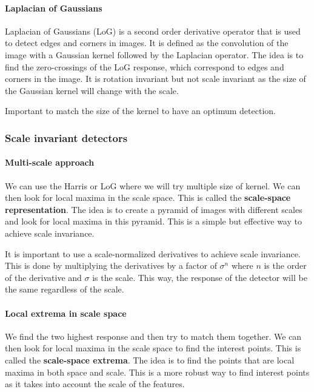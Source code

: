\documentclass[
  a4paper,
  ,captions=tableheading
]{scrartcl}
\begin{document}
\paragraph{Laplacian of Gaussians}\label{laplacian-of-gaussians}

Laplacian of Gaussians (LoG) is a second order derivative operator that
is used to detect edges and corners in images. It is defined as the
convolution of the image with a Gaussian kernel followed by the
Laplacian operator. The idea is to find the zero-crossings of the LoG
response, which correspond to edges and corners in the image. It is
rotation invariant but not scale invariant as the size of the Gaussian
kernel will change with the scale.

Important to match the size of the kernel to have an optimum detection.

\subsubsection{Scale invariant
detectors}\label{scale-invariant-detectors}

\paragraph{Multi-scale approach}\label{multi-scale-approach}

We can use the Harris or LoG where we will try multiple size of kernel.
We can then look for local maxima in the scale space. This is called the
\textbf{scale-space representation}. The idea is to create a pyramid of
images with different scales and look for local maxima in this pyramid.
This is a simple but effective way to achieve scale invariance.

It is important to use a scale-normalized derivatives to achieve scale
invariance. This is done by multiplying the derivatives by a factor of
\(\sigma^n\) where \(n\) is the order of the derivative and \(\sigma\)
is the scale. This way, the response of the detector will be the same
regardless of the scale.

\paragraph{Local extrema in scale
space}\label{local-extrema-in-scale-space}

We find the two highest response and then try to match them together. We
can then look for local maxima in the scale space to find the interest
points. This is called the \textbf{scale-space extrema}. The idea is to
find the points that are local maxima in both space and scale. This is a
more robust way to find interest points as it takes into account the
scale of the features.
\end{document}
